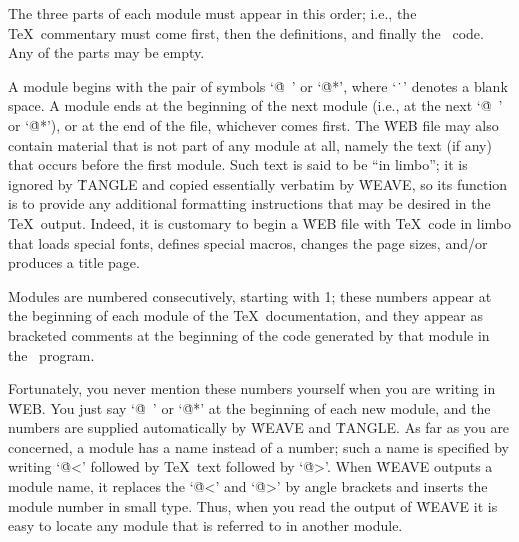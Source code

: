 \yskip\noindent The three parts of each module must appear in this order;
i.e., the \TeX\ commentary must come first, then the definitions, and
finally the \PASCAL\ code. Any of the parts may be empty.

\eject %

A module begins with the pair of symbols `\.{@\ }' or `\.{@*}', where
`\.{\ }' denotes a blank space. A module ends
at the beginning of the next module (i.e., at the next
`\.{@\ }' or `\.{@*}'), or at the end of the file, whichever comes first.
The \.{WEB} file may also contain material that is not part of any module
at all, namely the text (if any) that occurs before the first module.
Such text is said to be ``in limbo''; it is ignored by \.{TANGLE}
and copied essentially verbatim by \.{WEAVE}, so its function is to
provide any additional formatting instructions that may be desired in the
\TeX\ output. Indeed, it is customary to begin a \.{WEB} file with
\TeX\ code in limbo that loads special fonts, defines special macros,
changes the page sizes, and/or produces a title page.

Modules are numbered consecutively, starting with 1; these numbers appear
at the beginning of each module of the \TeX\ documentation, and they appear
as bracketed comments at the beginning of the code generated by that
module in the \PASCAL\ program.

Fortunately, you never mention these numbers yourself when you are writing
in \.{WEB}. You just say `\.{@\ }' or `\.{@*}' at the beginning of each
new module, and the numbers are supplied automatically by \.{WEAVE} and
\.{TANGLE}. As far as you are concerned, a module has a
name instead of a number; such a name is specified by writing
`\.{@<}' followed by \TeX\ text followed by `\.{@>}'. When \.{WEAVE}
outputs a module name, it replaces the `\.{@<}' and `\.{@>}' by
angle brackets and inserts the module number in small type. Thus, when you
read the output of \.{WEAVE} it is easy to locate any module that is
referred to in another module.


